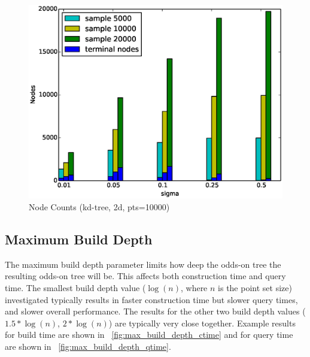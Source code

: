 \documentclass[mcs]{scsthesis}
\begin{document}
\begin{figure}
\begin{center}
\includegraphics[scale=0.5]{diagrams/kt_2d_nodecounts_pts10000_groupbysample.eps}
\caption{Node Counts (kd-tree, 2d, pts=10000)}
\label{fig:sample_set_size_nodecounts}
\end{center}
\end{figure}



\subsection{Maximum Build Depth}

The maximum build depth parameter limits how deep the odds-on tree the
resulting odds-on tree will be. This affects both construction time and query
time. The smallest build depth value ($\log(n)$, where $n$ is the point set size)
investigated typically results in faster construction time but slower query times,
and slower overall performance. The results for the other two build depth
values ($1.5*\log(n)$, $2*\log(n)$) are typically very close together.
Example results for build time are shown in ~\ref{fig:max_build_depth_ctime} and
for query time are shown in ~\ref{fig:max_build_depth_qtime}.
\end{document}

